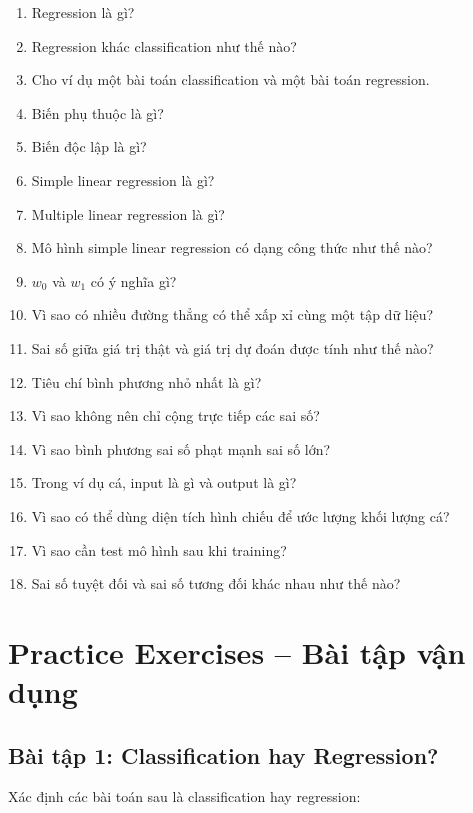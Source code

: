 \begin{enumerate}
    \item Regression là gì?
    \item Regression khác classification như thế nào?
    \item Cho ví dụ một bài toán classification và một bài toán regression.
    \item Biến phụ thuộc là gì?
    \item Biến độc lập là gì?
    \item Simple linear regression là gì?
    \item Multiple linear regression là gì?
    \item Mô hình simple linear regression có dạng công thức như thế nào?
    \item $w_0$ và $w_1$ có ý nghĩa gì?
    \item Vì sao có nhiều đường thẳng có thể xấp xỉ cùng một tập dữ liệu?
    \item Sai số giữa giá trị thật và giá trị dự đoán được tính như thế nào?
    \item Tiêu chí bình phương nhỏ nhất là gì?
    \item Vì sao không nên chỉ cộng trực tiếp các sai số?
    \item Vì sao bình phương sai số phạt mạnh sai số lớn?
    \item Trong ví dụ cá, input là gì và output là gì?
    \item Vì sao có thể dùng diện tích hình chiếu để ước lượng khối lượng cá?
    \item Vì sao cần test mô hình sau khi training?
    \item Sai số tuyệt đối và sai số tương đối khác nhau như thế nào?
\end{enumerate}

\section{Practice Exercises -- Bài tập vận dụng}

\subsection*{Bài tập 1: Classification hay Regression?}

Xác định các bài toán sau là classification hay regression:

